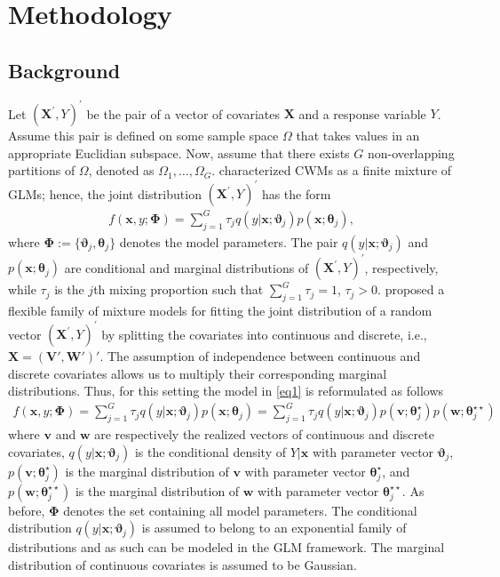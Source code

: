 \documentclass[12pt,letterpaper]{article}
\numberwithin{equation}{section}
\numberwithin{equation}{section}
\numberwithin{equation}{section}
\begin{document}
\section{Methodology}\label{sec:model}

\subsection{Background}

Let $(\bm{X^{'}}, Y)^{'}$  be the pair of a vector of covariates  $\bm{X}$ and a response variable $Y$. Assume this pair is defined on some sample space $\Omega$ that takes values in an appropriate Euclidian subspace. Now, assume that there exists $G$ non-overlapping partitions of $\Omega$, denoted as $\Omega_1, \ldots, \Omega_G$.  \cite{Gershenfeld:1997} characterized CWMs as a finite mixture of GLMs; hence, the joint distribution $(\bm{X^{'}}, Y )^{'}$ has the form
 \begin{align}
 f(\bm x, y; \bm{\Phi})= \sum_{j=1}^{G} \tau_j q(y|\bm{x};\bm{\vartheta}_j)p(\bm{x};\bm{\theta}_j),
\label{eq1}
\end{align}
where $\bm{\Phi}:=\{\bm{\vartheta}_j, \bm{\theta}_j\}$ denotes the model parameters.
%
The pair $q(y|\bm{x};\bm{\vartheta}_j)$ and $p(\bm{x};\bm{\theta}_j)$ are conditional and marginal distributions of $(\bm{X^{'}}, Y)^{'}$, respectively, while $\tau_j$ is the $j$th mixing proportion such that $\sum_{j=1}^{G}\tau_j=1$, $\tau_j>0$.
\cite{Ingrassia+Punzo+Vittadini+Minotti:2015} proposed a flexible family of mixture models for fitting the joint distribution of a random vector $(\bm{X^{'}}, Y)^{'}$ by splitting the covariates into continuous and discrete, i.e., $ \bm{X}=(\bm{V}',  \bm{W}')'$. The assumption of independence between continuous and discrete covariates allows us to multiply their corresponding marginal distributions. Thus, for this setting the model in \eqref{eq1} is reformulated as follows
\begin{align}
 f(\bm{x}, y; \bm{\Phi})= \sum_{j=1}^{G} \tau_j q(y|\bm{x};\bm{\vartheta}_j)p(\bm{x};\bm{\theta}_j)=\sum_{j=1}^{G} \tau_j q(y|\bm{x};\bm{\vartheta}_j)p(\bm{v}; \bm{\theta}_j^{\star})p(\bm{w};\bm{\theta}_j^{\star\star})
\label{eq2}
\end{align}
where $\bm{v}$ and $\bm{w}$ are respectively the realized vectors of continuous and discrete covariates, $q(y|\bm{x};\bm{\vartheta}_j)$ is the conditional density of $Y|\bm{x}$ with parameter vector $\bm{\vartheta}_j$, $p(\bm{v};\bm{\theta}_j^{\star})$ is the marginal distribution of $\bm{v}$ with parameter vector $\bm{\theta}_j^{\star}$, and $p(\bm{w};\bm{\theta}_j^{\star\star})$ is the marginal distribution of $\bm{w}$ with parameter vector $\bm{\theta}_j^{\star\star}$. As before, $\bm{\Phi}$ denotes the set containing all model parameters. %
The conditional distribution $q(y|\bm{x};\bm{\vartheta}_j)$ is assumed to belong to an exponential family of distributions and as such can be modeled in the GLM framework. The marginal distribution of continuous covariates is assumed to be Gaussian. 
\end{document}
